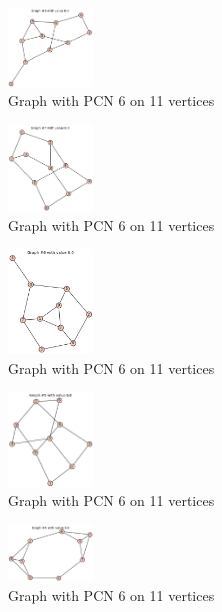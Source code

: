 \documentclass[12pt,a4paper]{amsart}
\theoremstyle{definition}
\theoremstyle{plain}
\begin{document}
\begin{figure}[h]
    \centering
    \includegraphics[width=0.2\textwidth]{Images/37}
    \caption{Graph with PCN 6 on 11 vertices}
\end{figure}
\begin{figure}[h]
    \centering
    \includegraphics[width=0.2\textwidth]{Images/38}
    \caption{Graph with PCN 6 on 11 vertices}
\end{figure}
\begin{figure}[h]
    \centering
    \includegraphics[width=0.2\textwidth]{Images/39}
    \caption{Graph with PCN 6 on 11 vertices}
\end{figure}
\begin{figure}[h]
    \centering
    \includegraphics[width=0.2\textwidth]{Images/40}
    \caption{Graph with PCN 6 on 11 vertices}
\end{figure}
\begin{figure}[h]
    \centering
    \includegraphics[width=0.2\textwidth]{Images/41}
    \caption{Graph with PCN 6 on 11 vertices}
\end{figure}
\end{document}
